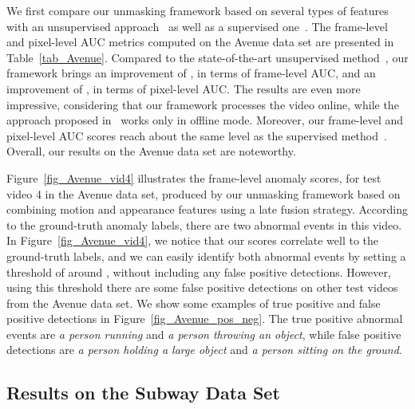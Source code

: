 \documentclass[10pt,twocolumn,letterpaper]{article}
\begin{document}
We first compare our unmasking framework based on several types of features with an unsupervised approach~\cite{Giorno-ECCV-2016} as well as a supervised one~\cite{Lu-ICCV-2013}. The frame-level and pixel-level AUC metrics computed on the Avenue data set are presented in Table~\ref{tab_Avenue}. Compared to the state-of-the-art unsupervised method~\cite{Giorno-ECCV-2016}, our framework brings an improvement of , in terms of frame-level AUC, and an improvement of , in terms of pixel-level AUC. The results are even more impressive, considering that our framework processes the video online, while the approach proposed in~\cite{Giorno-ECCV-2016} works only in offline mode. Moreover, our frame-level and pixel-level AUC scores reach about the same level as the supervised method~\cite{Lu-ICCV-2013}. Overall, our results on the Avenue data set are noteworthy.

Figure~\ref{fig_Avenue_vid4} illustrates the frame-level anomaly scores, for test video 4 in the Avenue data set, produced by our unmasking framework based on combining motion and appearance features using a late fusion strategy. According to the ground-truth anomaly labels, there are two abnormal events in this video. In Figure~\ref{fig_Avenue_vid4}, we notice that our scores correlate well to the ground-truth labels, and we can easily identify both abnormal events by setting a threshold of around , without including any false positive detections. However, using this threshold there are some false positive detections on other test videos from the Avenue data set. We show some examples of true positive and false positive detections in Figure~\ref{fig_Avenue_pos_neg}. The true positive abnormal events are \emph{a person running} and \emph{a person throwing an object}, while false positive detections are \emph{a person holding a large object} and \emph{a person sitting on the ground}. 

\subsection{Results on the Subway Data Set}
\end{document}
